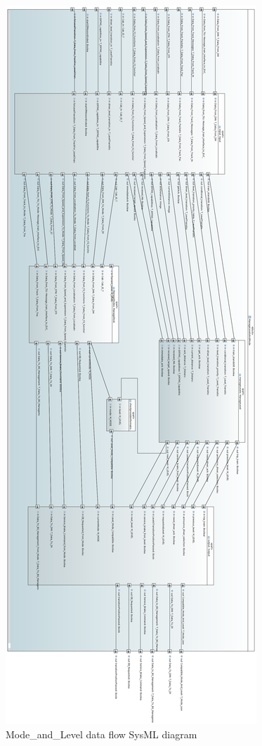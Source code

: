 \begin{figure}[p]
\center
\includegraphics[height=\textheight]{images/ManageLevelsAndModes.png}
\caption{Mode\_and\_Level data flow SysML diagram}\label{f:mode_and_level_interface}
\end{figure}

